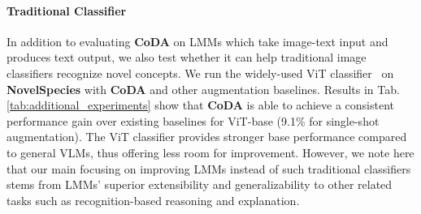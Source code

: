 \vspace{-0.9em}
\paragraph*{Traditional Classifier}
In addition to evaluating \textbf{CoDA} on LMMs which take image-text input and produces text output, we also test whether it can help traditional image classifiers recognize novel concepts. We run the widely-used ViT classifier~\cite{alexey2020image} on \textbf{NovelSpecies} with \textbf{CoDA} and other augmentation baselines. Results in Tab.\ref{tab:additional_experiments} show that \textbf{CoDA} is able to achieve a consistent performance gain over existing baselines for ViT-base (9.1\% for single-shot augmentation). The ViT classifier provides stronger base performance compared to general VLMs, thus offering less room for improvement. However, we note here that our main focusing on improving LMMs instead of such traditional classifiers stems from LMMs' superior extensibility and generalizability to other related tasks such as recognition-based reasoning and explanation.














